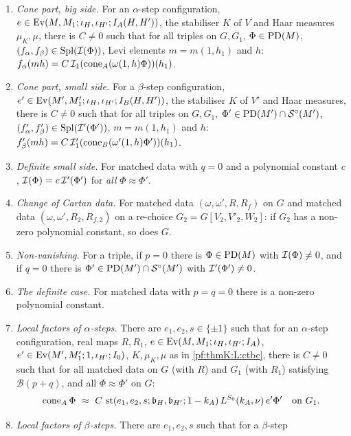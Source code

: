 \begin{definition}
\begin{enumerate}[label=(L\arabic*),leftmargin=*]
\item\label{pf:thmK:L:ctbc} \emph{Cone part, big side.} For an $\alpha$-step configuration,
$e\in\operatorname{Ev}(M,M_1;\iota_H,\iota_{H'};I_A(H,H'))$, the stabiliser $K$ of $V$ and Haar measures $\mu_K,\mu$, there is $C\ne0$
such that for all triples on $G,G_1$, $\Phi\in\operatorname{PD}(M)$, $(f_\alpha,f_\beta)\in\operatorname{Spl}(\mathcal{I}(\Phi))$, Levi elements
$m=m(1,h_1)$ and $h$: $f_\alpha(mh)=C\,\mathcal{I}_1(\operatorname{cone}_A(\omega(1,h)\Phi))(h_1)$.
\item\label{pf:thmK:L:ctsc} \emph{Cone part, small side.} For a $\beta$-step configuration,
$e'\in\operatorname{Ev}(M',M'_1;\iota_H,\iota_{H'};I_B(H,H'))$, the stabiliser $K$ of $V'$ and Haar measures, there is $C\ne0$ such
that for all triples on $G,G_1$, $\Phi'\in\operatorname{PD}(M')\cap\mathcal{S}^{\circ}(M')$, $(f'_\alpha,f'_\beta)\in\operatorname{Spl}(\mathcal{I}'(\Phi'))$,
$m=m(1,h_1)$ and $h$: $f'_\beta(mh)=C\,\mathcal{I}'_1(\operatorname{cone}_B(\omega'(1,h)\Phi'))(h_1)$.
\item\label{pf:thmK:L:anall} \emph{Definite small side.} For matched data with $q=0$ and a polynomial constant $c$,
$\mathcal{I}(\Phi)=c\,\mathcal{I}'(\Phi')$ for \emph{all} $\Phi\approx\Phi'$.
\item\label{pf:thmK:L:polre} \emph{Change of Cartan data.} For matched data $(\omega,\omega',R,R_f)$ on $G$ and matched data
$(\omega,\omega',R_2,R_{f,2})$ on a re-choice $G_2=G[V_2,V'_2,W_2]$: if $G_2$ has a non-zero polynomial constant, so does
$G$.
\item\label{pf:thmK:L:nonzeroan} \emph{Non-vanishing.} For a triple, if $p=0$ there is $\Phi\in\operatorname{PD}(M)$ with
$\mathcal{I}(\Phi)\ne0$, and if $q=0$ there is $\Phi'\in\operatorname{PD}(M')\cap\mathcal{S}^{\circ}(M')$ with $\mathcal{I}'(\Phi')\ne0$.
\item\label{pf:thmK:L:polzero} \emph{The definite case.} For matched data with $p=q=0$ there is a non-zero polynomial
constant.
\item\label{pf:thmK:L:locA} \emph{Local factors of $\alpha$-steps.} There are $e_1,e_2,s\in\{\pm1\}$ such that for an
$\alpha$-step configuration, real maps $R,R_1$, $e\in\operatorname{Ev}(M,M_1;\iota_H,\iota_{H'};I_A)$,
$e'\in\operatorname{Ev}(M',M'_1;1,\iota_{H'};I_0)$, $K,\mu_K,\mu$ as in \ref{pf:thmK:L:ctbc}, there is $C\ne0$ such that for all
matched data on $G$ (with $R$) and $G_1$ (with $R_1$) satisfying $\mathcal B(p+q)$, and all $\Phi\approx\Phi'$ on $G$:
\[
\thmKcone_A\Phi\ \approx\ C\,\thmKst(e_1,e_2,s;\mathfrak b_H,\mathfrak b_{H'};1-k_A)\,\thmKLS{k_A}{\nu}\,e'\Phi'\quad
\text{on }G_1.
\]
\item\label{pf:thmK:L:locB} \emph{Local factors of $\beta$-steps.} There are $e_1,e_2,s$ such that for a $\beta$-step

\end{enumerate}
\end{definition}
